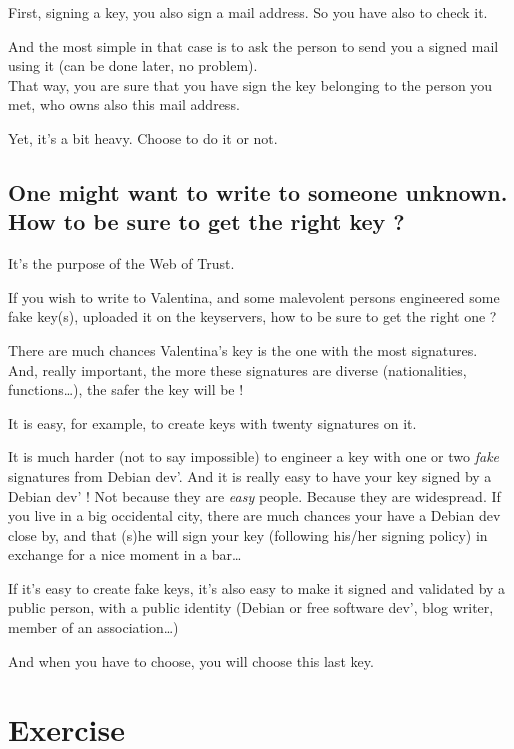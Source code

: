 First, signing a key, you also sign a mail address. So you have also to
check it.

And the most simple in that case is to ask the person to send you a
signed mail using it (can be done later, no problem).\\That way, you are
sure that you have sign the key belonging to the person you met, who
owns also this mail address.

Yet, it's a bit heavy. Choose to do it or not.

\subsection{One might want to write to someone unknown. How to be sure to get the right key ?}\label{one-might-want-to-write-to-someone-unknown.-how-to-be-sure-to-get-the-right-key}

It's the purpose of the Web of Trust.

If you wish to write to Valentina, and some malevolent persons
engineered some fake key(s), uploaded it on the keyservers, how to be
sure to get the right one ?

There are much chances Valentina's key is the one with the most
signatures.\\And, really important, the more these signatures are
diverse (nationalities, functions\ldots{}), the safer the key will be !

It is easy, for example, to create keys with twenty signatures on it.

It is much harder (not to say impossible) to engineer a key with one or
two \emph{fake} signatures from Debian dev'. And it is really easy to
have your key signed by a Debian dev' ! Not because they are \emph{easy}
people. Because they are widespread. If you live in a big occidental
city, there are much chances your have a Debian dev close by, and that
(s)he will sign your key (following his/her signing policy) in exchange
for a nice moment in a bar\ldots{}

If it's easy to create fake keys, it's also easy to make it signed and
validated by a public person, with a public identity (Debian or free
software dev', blog writer, member of an association\ldots{})

And when you have to choose, you will choose this last key.

\section{Exercise}\label{exercise}

